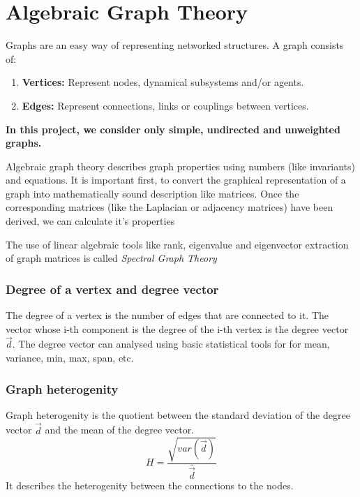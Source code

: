 \documentclass[a4paper,twoside, openright,12pt]{report}
\begin{document}

\section{Algebraic Graph Theory}

Graphs are an easy way of representing networked structures. A graph consists of: 
\begin{enumerate}
\item \textbf{Vertices:} Represent nodes, dynamical subsystems and/or agents.
\item \textbf{Edges:} Represent connections, links or couplings between vertices.
\end{enumerate}

\textbf{In this project, we consider only simple, undirected and unweighted graphs.} \linebreak

Algebraic graph theory describes graph properties using numbers (like invariants) and equations.
It is important first, to convert the graphical representation of a graph into mathematically sound description like
matrices. Once the corresponding matrices (like the Laplacian or adjacency matrices) have been derived, we can calculate it's properties \cite{godsil2001algebraic} 

The use of linear algebraic tools like rank, eigenvalue and eigenvector extraction of graph matrices is called \textit{Spectral Graph Theory} 

\subsubsection{Degree of a vertex and degree vector}
The degree of a vertex is the number of edges that are connected to it.
The vector whose i-th component is the degree of the i-th vertex is the degree vector $\vec{d}$. 
The degree vector can analysed using basic statistical tools for for mean, variance, min, max, span, etc.

\subsubsection{Graph heterogenity}
Graph heterogenity is the quotient between the standard deviation of the degree vector $\vec{d}$ and the mean of the degree vector.
\begin{equation}
 H = \frac{\sqrt{ var(\vec{d}) }}{\bar{\vec{d}}} 
\end{equation}
It describes the heterogenity between the connections to the nodes.   
\end{document}
